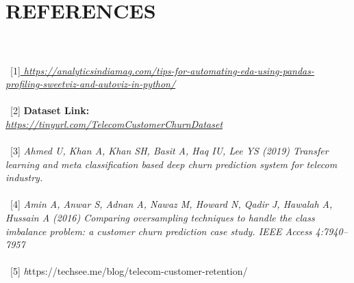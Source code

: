 \documentclass[a4paper, 10pt, conference]{ieeeconf}      %
\begin{document}
\\\
\section{\textbf{REFERENCES}}

\\\
\color{teal}
\\\
[1]\textit{\url{ https://analyticsindiamag.com/tips-for-automating-eda-using-pandas-profiling-sweetviz-and-autoviz-in-python/}}
\\\
\\\
[2] \textbf{ Dataset Link:} \\ \textit{ \url{https://tinyurl.com/TelecomCustomerChurnDataset}}
\\\
\\\
[3]  \textit{Ahmed U, Khan A, Khan SH, Basit A, Haq IU, Lee YS (2019) Transfer learning and meta classification based deep churn prediction system for telecom industry.}
\\\
\\\
[4] \textit{Amin A, Anwar S, Adnan A, Nawaz M, Howard N, Qadir J, Hawalah A, Hussain A (2016) Comparing oversampling techniques to handle the class imbalance problem: a customer churn prediction case study. IEEE Access 4:7940–7957}
\\\
\\\
[5] \textit
https://techsee.me/blog/telecom-customer-retention/
\\\
\\\
\end{document}
